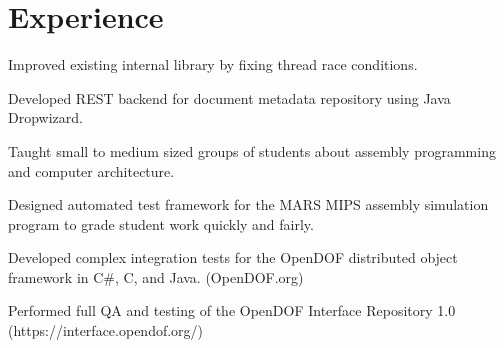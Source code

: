 \documentclass[letterpaper]{deedy-resume} %
\begin{document}
\begin{minipage}[t]{0.64\textwidth} %


\section{Experience}

\vspace{\topsep} %
\begin{tightitemize}
\item Improved existing internal library by fixing thread race conditions.
\item Developed REST backend for document metadata repository using Java Dropwizard.
\end{tightitemize}


\begin{tightitemize}
\item Taught small to medium sized groups of students about assembly programming and computer architecture.
\item Designed automated test framework for the MARS MIPS assembly simulation program to grade student work quickly and fairly.
\end{tightitemize}


\vspace{\topsep} %
\begin{tightitemize}
\item Developed complex integration tests for the OpenDOF distributed object framework in C\#, C, and Java. (OpenDOF.org)
\item Performed full QA and testing of the OpenDOF Interface Repository 1.0 (https://interface.opendof.org/)
\end{tightitemize}


\end{minipage}
\end{document}
